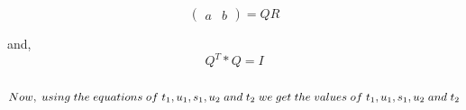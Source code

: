 \documentclass{article}
\begin{document}
\begin{itemize}
\[
\begin{pmatrix}
a & b
\end{pmatrix}
=
QR
\]

and, $$Q^{T}*Q=I$$\\


$$Now, \hspace{0.1 cm}using \hspace{0.1 cm}the \hspace{0.1 cm}equations \hspace{0.1 cm}of \hspace{0.1 cm}t_1, u_1, s_1,u_2 \hspace{0.1 cm}and \hspace{0.1 cm}t_2 \hspace{0.1 cm}we\\
\hspace{0.1 cm}get \hspace{0.1 cm}the \hspace{0.1 cm}values \hspace{0.1 cm}of \hspace{0.1 cm}t_1, u_1, s_1,u_2 \hspace{0.1 cm}and \hspace{0.1 cm}t_2 $$\\


\end{itemize}
\end{document}
